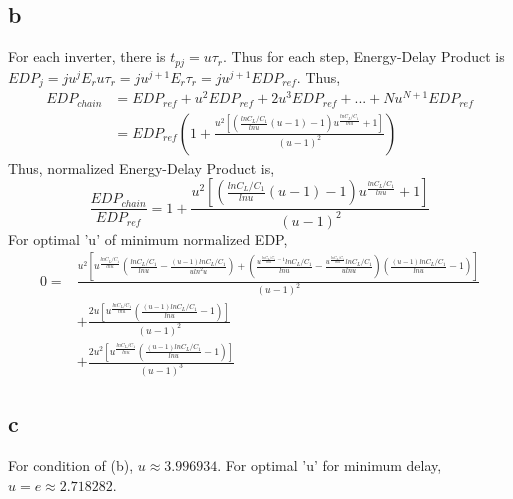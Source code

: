 \documentclass[a4paper,10pt]{article}
\begin{document}
\subsection*{b}
For each inverter, there is \begin{math}t_{pj} = u\tau_r\end{math}. Thus for each step, Energy-Delay Product is 
\begin{math} EDP_j = ju^j E_r u \tau_r = ju^{j+1} E_r \tau_r = ju^{j+1} EDP_{ref}\end{math}. Thus,
\begin{equation}
\begin{split}
  EDP_{chain} &= EDP_{ref} + u^2 EDP_{ref} + 2u^3 EDP_{ref} + ... + Nu^{N+1} EDP_{ref}\\
  &= EDP_{ref} (1+\frac{u^2[(\frac{ln C_L /C_1}{ln u} (u-1)-1)u^{\frac{ln C_L/C_1}{ln u}} +1]}{(u-1)^2})
\end{split}
\end{equation}
Thus, normalized Energy-Delay Product is,
\begin{equation}
 \frac{EDP_{chain}}{EDP_{ref}} = 1+\frac{u^2[(\frac{ln C_L /C_1}{ln u} (u-1)-1)u^{\frac{ln C_L/C_1}{ln u}} +1]}{(u-1)^2}
\end{equation}
For optimal 'u' of minimum normalized EDP,
\begin{equation}
\begin{split}
 0=&\frac{u^2 [u^{\frac{ln C_L/C_1}{ln u}}(\frac{ln C_L/C_1}{ln u}-\frac{(u-1)ln C_L/C_1}{uln^2 u})+(\frac{u^{\frac{ln C_L/C_1}{ln u}-1}ln C_L/C_1}{ln u}-\frac{u^{\frac{ln C_L/C_1}{ln u}}ln C_L/C_1}{uln u})(\frac{(u-1)ln C_L/C_1}{ln u}-1)]}{(u-1)^2}\\
 &+\frac{2u[u^{\frac{ln C_L/C_1}{ln u}}(\frac{(u-1)ln C_L/C_1}{ln u}-1)]}{(u-1)^2}\\
 &+\frac{2u^2[u^{\frac{ln C_L/C_1}{ln u}}(\frac{(u-1)ln C_L/C_1}{ln u}-1)]}{(u-1)^3}
\end{split}
\end{equation}
\subsection*{c}
For condition of (b), \begin{math}u\approx 3.996934\end{math}. For optimal 'u' for minimum delay, \begin{math}u=e\approx 2.718282\end{math}.
\end{document}
